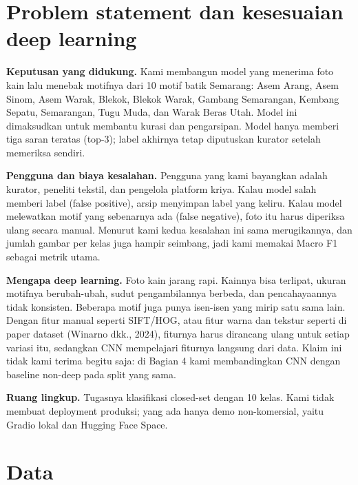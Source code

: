 \documentclass[10pt,a4paper]{article}
\begin{document}
\section{Problem statement dan kesesuaian deep learning}\label{problem-statement-dan-kesesuaian-deep-learning}

\textbf{Keputusan yang didukung.} Kami membangun model yang menerima foto kain lalu menebak motifnya dari 10 motif batik Semarang: Asem Arang, Asem Sinom, Asem Warak, Blekok, Blekok Warak, Gambang Semarangan, Kembang Sepatu, Semarangan, Tugu Muda, dan Warak Beras Utah. Model ini dimaksudkan untuk membantu kurasi dan pengarsipan. Model hanya memberi tiga saran teratas (top-3); label akhirnya tetap diputuskan kurator setelah memeriksa sendiri.

\textbf{Pengguna dan biaya kesalahan.} Pengguna yang kami bayangkan adalah kurator, peneliti tekstil, dan pengelola platform kriya. Kalau model salah memberi label (false positive), arsip menyimpan label yang keliru. Kalau model melewatkan motif yang sebenarnya ada (false negative), foto itu harus diperiksa ulang secara manual. Menurut kami kedua kesalahan ini sama merugikannya, dan jumlah gambar per kelas juga hampir seimbang, jadi kami memakai Macro F1 sebagai metrik utama.

\textbf{Mengapa deep learning.} Foto kain jarang rapi. Kainnya bisa terlipat, ukuran motifnya berubah-ubah, sudut pengambilannya berbeda, dan pencahayaannya tidak konsisten. Beberapa motif juga punya isen-isen yang mirip satu sama lain. Dengan fitur manual seperti SIFT/HOG, atau fitur warna dan tekstur seperti di paper dataset (Winarno dkk., 2024), fiturnya harus dirancang ulang untuk setiap variasi itu, sedangkan CNN mempelajari fiturnya langsung dari data. Klaim ini tidak kami terima begitu saja: di Bagian 4 kami membandingkan CNN dengan baseline non-deep pada split yang sama.

\textbf{Ruang lingkup.} Tugasnya klasifikasi closed-set dengan 10 kelas. Kami tidak membuat deployment produksi; yang ada hanya demo non-komersial, yaitu Gradio lokal dan Hugging Face Space.

\section{Data}\label{data}
\end{document}
